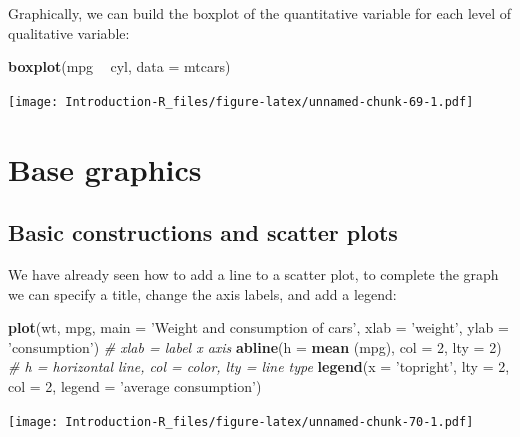 \documentclass[]{book}
\newenvironment{Shaded}{\begin{snugshade}}{\end{snugshade}}
\newcommand{\CommentTok}[1]{\textcolor[rgb]{0.56,0.35,0.01}{\textit{#1}}}
\newcommand{\DataTypeTok}[1]{\textcolor[rgb]{0.13,0.29,0.53}{#1}}
\newcommand{\DecValTok}[1]{\textcolor[rgb]{0.00,0.00,0.81}{#1}}
\newcommand{\KeywordTok}[1]{\textcolor[rgb]{0.13,0.29,0.53}{\textbf{#1}}}
\newcommand{\NormalTok}[1]{#1}
\newcommand{\OperatorTok}[1]{\textcolor[rgb]{0.81,0.36,0.00}{\textbf{#1}}}
\newcommand{\StringTok}[1]{\textcolor[rgb]{0.31,0.60,0.02}{#1}}
\begin{document}
Graphically, we can build the boxplot of the quantitative variable for each level of qualitative variable:

\begin{Shaded}
\begin{Highlighting}[]
\KeywordTok{boxplot}\NormalTok{(mpg }\OperatorTok{~}\StringTok{ }\NormalTok{cyl, }\DataTypeTok{data =}\NormalTok{ mtcars)}
\end{Highlighting}
\end{Shaded}

\texttt{[image: Introduction-R\_files/figure-latex/unnamed-chunk-69-1.pdf]}

\hypertarget{base-graphics}{%
\chapter{Base graphics}\label{base-graphics}}

\hypertarget{basic-constructions-and-scatter-plots}{%
\section{Basic constructions and scatter plots}\label{basic-constructions-and-scatter-plots}}

We have already seen how to add a line to a scatter plot, to complete the graph we can specify a title, change the axis labels, and add a legend:

\begin{Shaded}
\begin{Highlighting}[]
\KeywordTok{plot}\NormalTok{(wt, mpg,}
     \DataTypeTok{main =} \StringTok{'Weight and consumption of cars'}\NormalTok{,}
     \DataTypeTok{xlab =} \StringTok{'weight'}\NormalTok{, }\DataTypeTok{ylab =} \StringTok{'consumption'}\NormalTok{) }\CommentTok{# xlab = label x axis}
\KeywordTok{abline}\NormalTok{(}\DataTypeTok{h =} \KeywordTok{mean}\NormalTok{ (mpg), }\DataTypeTok{col =} \DecValTok{2}\NormalTok{, }\DataTypeTok{lty =} \DecValTok{2}\NormalTok{) }\CommentTok{# h = horizontal line, col = color, lty = line type}
\KeywordTok{legend}\NormalTok{(}\DataTypeTok{x =} \StringTok{'topright'}\NormalTok{, }\DataTypeTok{lty =} \DecValTok{2}\NormalTok{, }\DataTypeTok{col =} \DecValTok{2}\NormalTok{, }\DataTypeTok{legend =} \StringTok{'average consumption'}\NormalTok{)}
\end{Highlighting}
\end{Shaded}

\texttt{[image: Introduction-R\_files/figure-latex/unnamed-chunk-70-1.pdf]}
\end{document}
